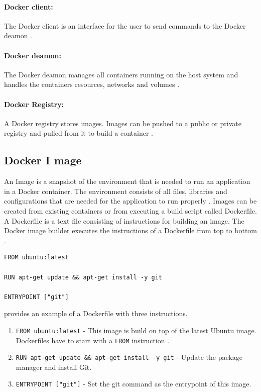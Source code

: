 \paragraph{Docker client:} The Docker client is an interface for the user to send commands to the Docker deamon \cite{Docker2020Docs}.


\paragraph{Docker deamon:} The Docker deamon manages all containers running on the host system and handles the containers resources, networks and volumes \cite{Bullington2020Docker}.


\paragraph{Docker Registry:} A Docker registry stores images. Images can be pushed to a public or private registry and pulled from it to build a container \cite{Docker2020Docs}.


\subsection{Docker I mage}
An Image is a snapshot of the environment that is needed to run an application in a Docker container. The environment consists of all files, libraries and configurations that are needed for the application to run properly \cite{Docker2020Docs, Nickoloff2019Docker}.
Images can be created from existing containers or from executing a build script called Dockerfile. A Dockerfile is a text file consisting of instructions for building an image. The Docker image builder executes the instructions of a Dockerfile from top to bottom \cite{Nickoloff2019Docker}.

\begin{lstlisting}[frame=single, label=lst:docker_dockerfile, caption=Example of a Dockerfile, captionpos=b]
FROM ubuntu:latest

RUN apt-get update && apt-get install -y git

ENTRYPOINT ["git"]
\end{lstlisting}

 provides an example of a Dockerfile with three instructions.
\begin{enumerate}
\item \texttt{FROM ubuntu:latest} - This image is build on top of the latest Ubuntu image. Dockerfiles have to start with a \texttt{FROM} instruction \cite{Nickoloff2019Docker}.
\item \texttt{RUN apt-get update \&\& apt-get install -y git} - Update the package manager and install Git.
\item \texttt{ENTRYPOINT ["git"]} - Set the git command as the entrypoint of this image.
\end{enumerate}

